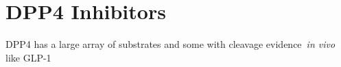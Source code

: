 \section{DPP4 Inhibitors}
DPP4 has a large array of substrates and some with cleavage evidence~\textit{in vivo} like GLP-1 